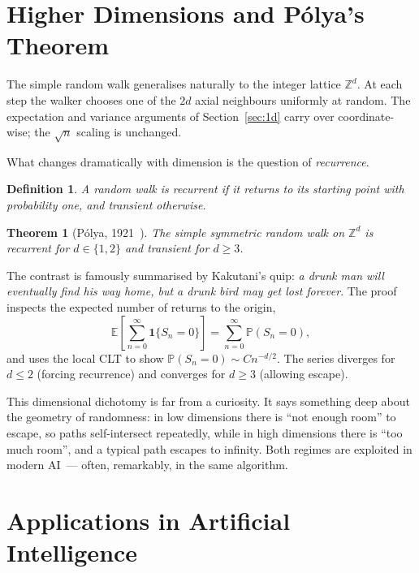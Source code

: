 \documentclass[conference,a4paper,10pt]{IEEEtran}
\newtheorem{theorem}{Theorem}
\newtheorem{definition}{Definition}
\begin{document}
\section{Higher Dimensions and P\'{o}lya's Theorem}\label{sec:dim}
The simple random walk generalises naturally to the integer lattice
$\mathbb{Z}^{d}$. At each step the walker chooses one of the $2d$ axial
neighbours uniformly at random. The expectation and variance arguments
of Section~\ref{sec:1d} carry over coordinate-wise; the
$\sqrt{n}$ scaling is unchanged.

What changes dramatically with dimension is the question of
\emph{recurrence}.

\begin{definition}
A random walk is \emph{recurrent} if it returns to its starting point
with probability one, and \emph{transient} otherwise.
\end{definition}

\begin{theorem}[P\'{o}lya, 1921~\cite{polya1921}]
The simple symmetric random walk on $\mathbb{Z}^{d}$ is recurrent for
$d\in\{1,2\}$ and transient for $d\geq 3$.
\end{theorem}

The contrast is famously summarised by Kakutani's quip: \emph{a drunk
man will eventually find his way home, but a drunk bird may get lost
forever}. The proof inspects the expected number of returns to the origin,
\begin{equation}
\mathbb{E}\!\left[\sum_{n=0}^{\infty}\mathbf{1}\{S_{n}=0\}\right]
=\sum_{n=0}^{\infty}\mathbb{P}(S_{n}=0),
\end{equation}
and uses the local CLT to show $\mathbb{P}(S_{n}=0)\sim C n^{-d/2}$. The
series diverges for $d\le 2$ (forcing recurrence) and converges for
$d\ge 3$ (allowing escape).

This dimensional dichotomy is far from a curiosity. It says something
deep about the geometry of randomness: in low dimensions there is
``not enough room'' to escape, so paths self-intersect repeatedly, while
in high dimensions there is ``too much room'', and a typical path
escapes to infinity. Both regimes are exploited in modern AI~--- often,
remarkably, in the same algorithm.

\section{Applications in Artificial Intelligence}\label{sec:ai}
\end{document}
